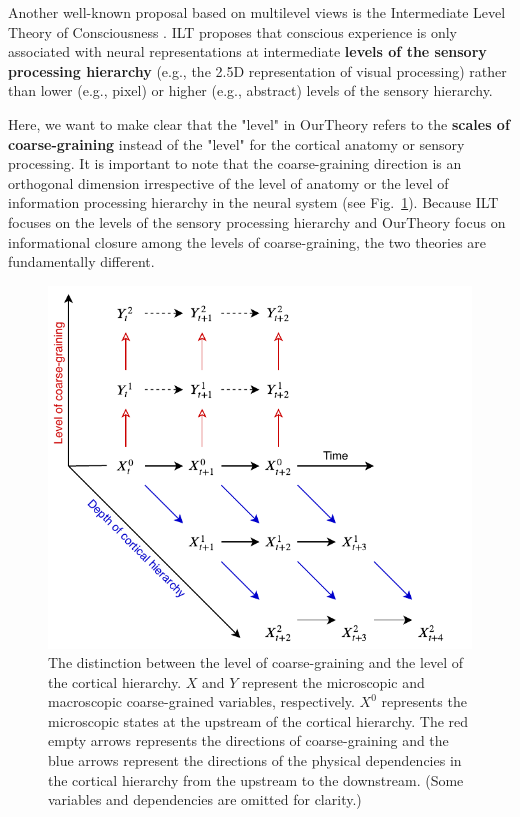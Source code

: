 \documentclass[utf8]{article}
\begin{document}
    		Another well-known proposal based on multilevel views is the Intermediate Level Theory of Consciousness \citep[ILT]{prinz2007intermediate, jackendoff1987consciousness}. ILT proposes that conscious experience is only associated with neural representations at intermediate \textbf{levels of the sensory processing hierarchy} (e.g., the 2.5D representation of visual processing) rather than lower (e.g., pixel) or higher (e.g., abstract) levels of the sensory hierarchy. 
    	
    		Here, we want to make clear that the "level" in \ac{OurTheory} refers to the \textbf{scales of coarse-graining} instead of the "level" for the cortical anatomy or sensory processing. It is important to note that the coarse-graining direction is an orthogonal dimension irrespective of the level of anatomy or the level of information processing hierarchy in the neural system (see Fig.~\ref{fig:hierarchy}). Because ILT focuses on the levels of the sensory processing hierarchy and \ac{OurTheory} focus on informational closure among the levels of coarse-graining, the two theories are fundamentally different.  
    		
    		
    		\begin{figure}[H]
    			\includegraphics[width=\textwidth]{WritingMaterials/Fig_SeperationOfCGandCortHierachy/SeperationOfCGandCortHierachy.pdf}
				\caption{The distinction between the level of coarse-graining and the level of the cortical hierarchy. $X$ and $Y$ represent the microscopic and macroscopic coarse-grained  variables, respectively. $X^0$ represents the microscopic states at the upstream of the cortical hierarchy. The red empty arrows represents the directions of coarse-graining and the blue arrows represent the directions of the physical dependencies in the cortical hierarchy from the upstream to the downstream. (Some variables and dependencies are omitted for clarity.)}
				\label{fig:hierarchy}
    		\end{figure} 
    		
\end{document}
